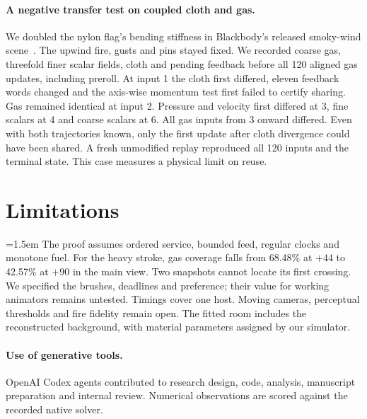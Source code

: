 \documentclass[acmtog,anonymous,review]{acmart}
\begin{document}
\paragraph{A negative transfer test on coupled cloth and gas.}
We doubled the nylon flag's bending stiffness in Blackbody's released smoky-wind scene~\cite{blackbody2026}. The upwind fire, gusts and pins stayed fixed. We recorded coarse gas, threefold finer scalar fields, cloth and pending feedback before all 120 aligned gas updates, including preroll. At input 1 the cloth first differed, eleven feedback words changed and the axis-wise momentum test first failed to certify sharing. Gas remained identical at input 2. Pressure and velocity first differed at 3, fine scalars at 4 and coarse scalars at 6. All gas inputs from 3 onward differed. Even with both trajectories known, only the first update after cloth divergence could have been shared. A fresh unmodified replay reproduced all 120 inputs and the terminal state. This case measures a physical limit on reuse.


\section{Limitations}
\begingroup\emergencystretch=1.5em The proof assumes ordered service, bounded feed, regular clocks and monotone fuel. For the heavy stroke, gas coverage falls from 68.48\% at $+44$ to 42.57\% at $+90$ in the main view. Two snapshots cannot locate its first crossing. We specified the brushes, deadlines and preference; their value for working animators remains untested. Timings cover one host. Moving cameras, perceptual thresholds and fire fidelity remain open. The fitted room includes the reconstructed background, with material parameters assigned by our simulator.\par\endgroup

\paragraph{Use of generative tools.}
OpenAI Codex agents contributed to research design, code, analysis, manuscript preparation and internal review. Numerical observations are scored against the recorded native solver.


\end{document}
